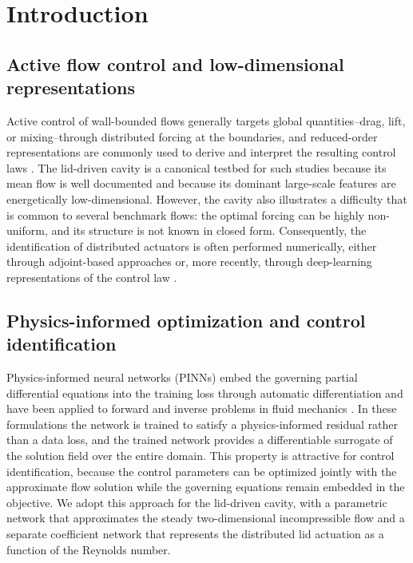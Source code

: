 \documentclass[aip,pof,reprint,superscriptaddress]{revtex4-2}
\begin{document}
\section{Introduction}\label{sec:intro}

\subsection{Active flow control and low-dimensional representations}

Active control of wall-bounded flows generally targets global quantities--drag, lift, or mixing--through distributed forcing at the boundaries, and reduced-order representations are commonly used to derive and interpret the resulting control laws \cite{brunton2015closed,gad2000flow,rowley2004model,noack2003hierarchy,taira2017modal}. The lid-driven cavity is a canonical testbed for such studies because its mean flow is well documented \cite{ghia1982high} and because its dominant large-scale features are energetically low-dimensional. However, the cavity also illustrates a difficulty that is common to several benchmark flows: the optimal forcing can be highly non-uniform, and its structure is not known in closed form. Consequently, the identification of distributed actuators is often performed numerically, either through adjoint-based approaches \cite{bewley2001dns,bergmann2005optimal} or, more recently, through deep-learning representations of the control law \cite{brunton2015closed,taira2017modal}.

\subsection{Physics-informed optimization and control identification}

Physics-informed neural networks (PINNs) embed the governing partial differential equations into the training loss through automatic differentiation \cite{raissi2019physics,karniadakis2021physics} and have been applied to forward and inverse problems in fluid mechanics \cite{raissi2020hidden,jin2021nsfnets,sun2020surrogate,cuomo2022,velivelli2024pinn}. In these formulations the network is trained to satisfy a physics-informed residual rather than a data loss, and the trained network provides a differentiable surrogate of the solution field over the entire domain. This property is attractive for control identification, because the control parameters can be optimized jointly with the approximate flow solution while the governing equations remain embedded in the objective. We adopt this approach for the lid-driven cavity, with a parametric network that approximates the steady two-dimensional incompressible flow and a separate coefficient network that represents the distributed lid actuation as a function of the Reynolds number.
\end{document}
